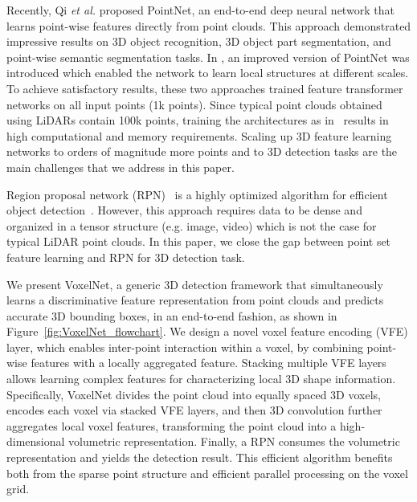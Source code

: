 \documentclass[10pt,twocolumn,letterpaper]{article}
\begin{document}
Recently, Qi \textit{et al.}\cite{REF:qi2017pointnet} proposed PointNet, an end-to-end deep neural network that learns point-wise features directly from point clouds. This approach demonstrated impressive results on 3D object recognition, 3D object part segmentation, and point-wise semantic segmentation tasks. In \cite{REF:qi2017pointnetplusplus}, an improved version of PointNet was introduced which enabled the network to learn local structures at different scales. To achieve satisfactory results, these two approaches trained feature transformer networks on all input points (1k points). Since typical point clouds obtained using LiDARs contain 100k points, training the architectures as in~\cite{REF:qi2017pointnet,REF:qi2017pointnetplusplus} results in high computational and memory requirements.   Scaling up 3D feature learning networks to orders of magnitude more points and to 3D detection tasks are the main challenges that we address in this paper. 




Region proposal network (RPN)~\cite{REF:NIPS2015_5638} is a highly optimized algorithm for efficient object detection~\cite{REF:ResNet2016,REF:cvpr17chen,REF:YOLO9000_2017,REF:SSD_Liu2016}. However, this approach requires data to be dense and organized in a tensor structure (e.g. image, video) which is not the case for typical LiDAR point clouds. In this paper, we close the gap between point set feature learning and RPN for 3D detection task.

We present VoxelNet, a generic 3D detection framework that simultaneously learns a discriminative feature representation from point clouds and predicts accurate 3D bounding boxes, in an end-to-end fashion, as shown in Figure~\ref{fig:VoxelNet_flowchart}.
We design a novel voxel feature encoding (VFE) layer, which enables inter-point interaction within a voxel, by combining point-wise features with a locally aggregated feature. Stacking multiple VFE layers allows learning complex features for characterizing local 3D shape information. Specifically, VoxelNet divides the point cloud into equally spaced 3D voxels, encodes each voxel via stacked VFE layers, and then 3D convolution further aggregates local voxel features, transforming the point cloud into a high-dimensional volumetric representation. Finally, a RPN consumes the volumetric representation and yields the detection result. This efficient algorithm benefits both from the sparse point structure and efficient parallel processing on the voxel grid.
\end{document}

